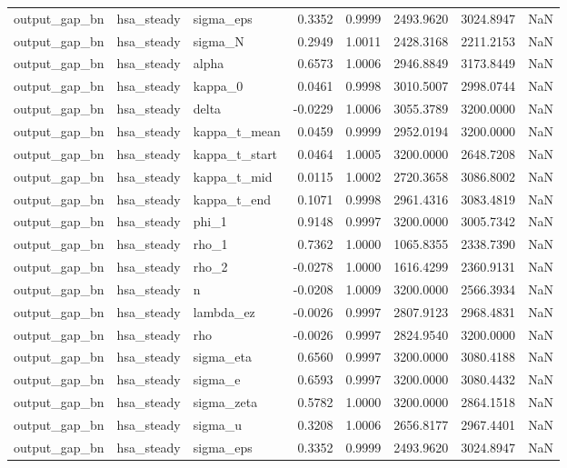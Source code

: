 \begin{tabular}{lllrrrrl}
output\_gap\_bn & hsa\_steady & sigma\_eps & 0.3352 & 0.9999 & 2493.9620 & 3024.8947 & NaN \\
output\_gap\_bn & hsa\_steady & sigma\_N & 0.2949 & 1.0011 & 2428.3168 & 2211.2153 & NaN \\
output\_gap\_bn & hsa\_steady & alpha & 0.6573 & 1.0006 & 2946.8849 & 3173.8449 & NaN \\
output\_gap\_bn & hsa\_steady & kappa\_0 & 0.0461 & 0.9998 & 3010.5007 & 2998.0744 & NaN \\
output\_gap\_bn & hsa\_steady & delta & -0.0229 & 1.0006 & 3055.3789 & 3200.0000 & NaN \\
output\_gap\_bn & hsa\_steady & kappa\_t\_mean & 0.0459 & 0.9999 & 2952.0194 & 3200.0000 & NaN \\
output\_gap\_bn & hsa\_steady & kappa\_t\_start & 0.0464 & 1.0005 & 3200.0000 & 2648.7208 & NaN \\
output\_gap\_bn & hsa\_steady & kappa\_t\_mid & 0.0115 & 1.0002 & 2720.3658 & 3086.8002 & NaN \\
output\_gap\_bn & hsa\_steady & kappa\_t\_end & 0.1071 & 0.9998 & 2961.4316 & 3083.4819 & NaN \\
output\_gap\_bn & hsa\_steady & phi\_1 & 0.9148 & 0.9997 & 3200.0000 & 3005.7342 & NaN \\
output\_gap\_bn & hsa\_steady & rho\_1 & 0.7362 & 1.0000 & 1065.8355 & 2338.7390 & NaN \\
output\_gap\_bn & hsa\_steady & rho\_2 & -0.0278 & 1.0000 & 1616.4299 & 2360.9131 & NaN \\
output\_gap\_bn & hsa\_steady & n & -0.0208 & 1.0009 & 3200.0000 & 2566.3934 & NaN \\
output\_gap\_bn & hsa\_steady & lambda\_ez & -0.0026 & 0.9997 & 2807.9123 & 2968.4831 & NaN \\
output\_gap\_bn & hsa\_steady & rho & -0.0026 & 0.9997 & 2824.9540 & 3200.0000 & NaN \\
output\_gap\_bn & hsa\_steady & sigma\_eta & 0.6560 & 0.9997 & 3200.0000 & 3080.4188 & NaN \\
output\_gap\_bn & hsa\_steady & sigma\_e & 0.6593 & 0.9997 & 3200.0000 & 3080.4432 & NaN \\
output\_gap\_bn & hsa\_steady & sigma\_zeta & 0.5782 & 1.0000 & 3200.0000 & 2864.1518 & NaN \\
output\_gap\_bn & hsa\_steady & sigma\_u & 0.3208 & 1.0006 & 2656.8177 & 2967.4401 & NaN \\
output\_gap\_bn & hsa\_steady & sigma\_eps & 0.3352 & 0.9999 & 2493.9620 & 3024.8947 & NaN \\

\end{tabular}
